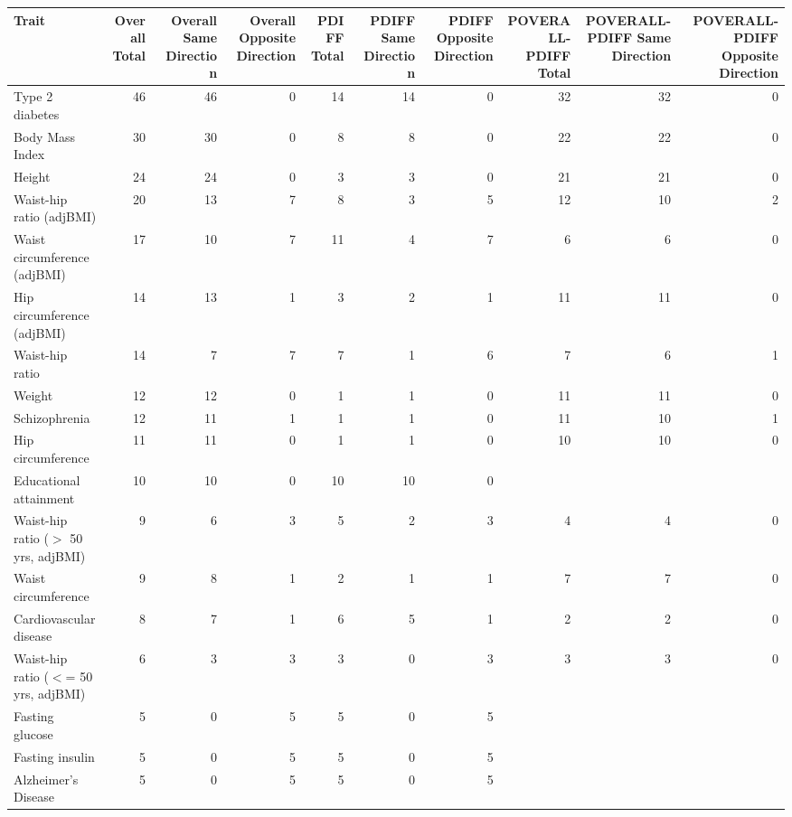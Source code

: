 \begin{table}[ht]
\centering
\begin{tabular}{lrrrrrrrrr}
  \hline
Trait & Overall Total & Overall Same Direction & Overall Opposite Direction & PDIFF Total & PDIFF Same Direction & PDIFF Opposite Direction & POVERALL-PDIFF Total & POVERALL-PDIFF Same Direction & POVERALL-PDIFF Opposite Direction \\ 
  \hline
Type 2 diabetes &  46 &  46 &   0 &  14 &  14 &   0 &  32 &  32 &   0 \\ 
  Body Mass Index &  30 &  30 &   0 &   8 &   8 &   0 &  22 &  22 &   0 \\ 
  Height &  24 &  24 &   0 &   3 &   3 &   0 &  21 &  21 &   0 \\ 
  Waist-hip ratio (adjBMI) &  20 &  13 &   7 &   8 &   3 &   5 &  12 &  10 &   2 \\ 
  Waist circumference (adjBMI) &  17 &  10 &   7 &  11 &   4 &   7 &   6 &   6 &   0 \\ 
  Hip circumference (adjBMI) &  14 &  13 &   1 &   3 &   2 &   1 &  11 &  11 &   0 \\ 
  Waist-hip ratio &  14 &   7 &   7 &   7 &   1 &   6 &   7 &   6 &   1 \\ 
  Weight &  12 &  12 &   0 &   1 &   1 &   0 &  11 &  11 &   0 \\ 
  Schizophrenia &  12 &  11 &   1 &   1 &   1 &   0 &  11 &  10 &   1 \\ 
  Hip circumference &  11 &  11 &   0 &   1 &   1 &   0 &  10 &  10 &   0 \\ 
  Educational attainment &  10 &  10 &   0 &  10 &  10 &   0 &  &  &  \\ 
  Waist-hip ratio ($>$ 50 yrs, adjBMI) &   9 &   6 &   3 &   5 &   2 &   3 &   4 &   4 &   0 \\ 
  Waist circumference &   9 &   8 &   1 &   2 &   1 &   1 &   7 &   7 &   0 \\ 
  Cardiovascular disease &   8 &   7 &   1 &   6 &   5 &   1 &   2 &   2 &   0 \\ 
  Waist-hip ratio ($<$= 50 yrs, adjBMI) &   6 &   3 &   3 &   3 &   0 &   3 &   3 &   3 &   0 \\ 
  Fasting glucose &   5 &   0 &   5 &   5 &   0 &   5 &  &  &  \\ 
  Fasting insulin &   5 &   0 &   5 &   5 &   0 &   5 &  &  &  \\ 
  Alzheimer's Disease &   5 &   0 &   5 &   5 &   0 &   5 &  &  &  \\ 

\end{tabular}
\end{table}
